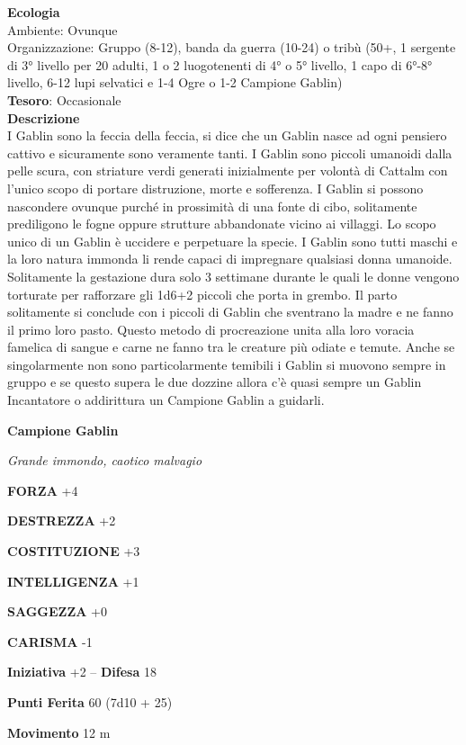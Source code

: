 \begin{multicols}{2}
	\textbf{Ecologia}\\
	Ambiente: Ovunque\\
	Organizzazione: Gruppo (8-12), banda da guerra (10-24) o tribù (50+, 1 sergente di 3° livello per 20 adulti, 1 o 2 luogotenenti di 4° o 5° livello, 1 capo di 6°-8° livello, 6-12 lupi selvatici e 1-4 Ogre o 1-2 Campione Gablin)\\
	\textbf{Tesoro}: Occasionale\\
	\textbf{Descrizione}\\
	I Gablin sono la feccia della feccia, si dice che un Gablin nasce ad ogni pensiero cattivo e sicuramente sono veramente tanti.
	I Gablin sono piccoli umanoidi dalla pelle scura, con striature verdi generati inizialmente per volontà di Cattalm con l'unico scopo di portare distruzione, morte e sofferenza.
	I Gablin si possono nascondere ovunque purché in prossimità di una fonte di cibo, solitamente prediligono le fogne oppure strutture abbandonate vicino ai villaggi.
	Lo scopo unico di un Gablin è uccidere e perpetuare la specie. I Gablin sono tutti maschi e la loro natura immonda li rende capaci di impregnare qualsiasi donna umanoide.
	Solitamente la gestazione dura solo 3 settimane durante le quali le donne vengono torturate per rafforzare gli 1d6+2 piccoli che porta in grembo. Il parto solitamente si conclude con i piccoli di Gablin che sventrano la madre e ne fanno il primo loro pasto.
	Questo metodo di procreazione unita alla loro voracia famelica di sangue e carne ne fanno tra le creature più odiate e temute.
	Anche se singolarmente non sono particolarmente temibili i Gablin si muovono sempre in gruppo e se questo supera le due dozzine allora c'è quasi sempre un Gablin Incantatore o addirittura un Campione Gablin a guidarli.


	\medskip{}\textbf{Campione Gablin}

	\textit{Grande immondo, caotico malvagio}

	\textbf{FORZA} +4

	\textbf{DESTREZZA} +2

	\textbf{COSTITUZIONE} +3

	\textbf{INTELLIGENZA} +1

	\textbf{SAGGEZZA} +0

	\textbf{CARISMA} -1

	\textbf{Iniziativa} +2 -- \textbf{Difesa} 18

	\textbf{Punti Ferita} 60 (7d10 + 25)

	\textbf{Movimento} 12 m


\end{multicols}
